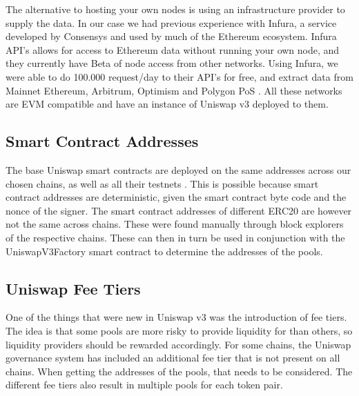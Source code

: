 The alternative to hosting your own nodes is using an infrastructure provider to supply the data. In our case we had previous experience with Infura, a service developed by Consensys and used by much of the Ethereum ecosystem. Infura API's allows for access to Ethereum data without running your own node, and they currently have Beta of node access from other networks. Using Infura, we were able to do 100.000 request/day to their API's for free, and extract data from Mainnet Ethereum, Arbitrum, Optimism \cite{optimism} and Polygon PoS \cite{polygonPOS}. All these networks are EVM compatible and have an instance of Uniswap v3 deployed to them.

\subsection{Smart Contract Addresses}
The base Uniswap smart contracts are deployed on the same addresses across our chosen chains, as well as all their testnets \cite{uniswapcontracts}. This is possible because smart contract addresses are deterministic, given the smart contract byte code and the nonce of the signer. The smart contract addresses of different ERC20 are however not the same across chains. These were found manually through block explorers of the respective chains. These can then in turn be used in conjunction with the UniswapV3Factory smart contract to determine the addresses of the pools.

\subsection{Uniswap Fee Tiers}
One of the things that were new in Uniswap v3 was the introduction of fee tiers. The idea is that some pools are more risky to provide liquidity for than others, so liquidity providers should be rewarded accordingly. For some chains, the Uniswap governance system has included an additional fee tier that is not present on all chains. When getting the addresses of the pools, that needs to be considered. The different fee tiers also result in multiple pools for each token pair.


